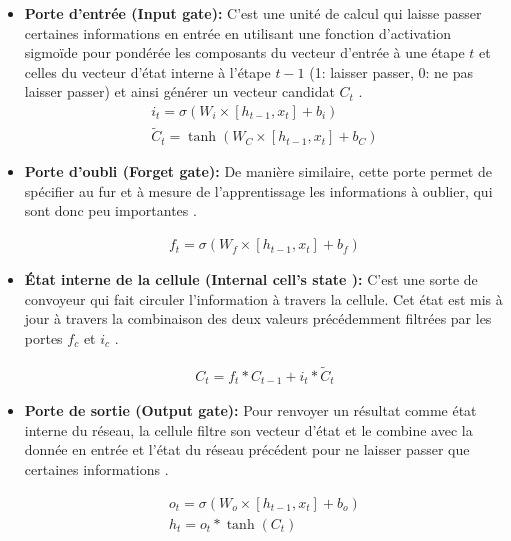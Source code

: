 		\begin{itemize}
			\item \textbf{Porte d'entrée (Input gate): } C'est une unité de calcul qui laisse passer certaines informations en entrée en utilisant une fonction d'activation sigmoïde pour pondérée les composants du vecteur d'entrée à une étape $t$ et celles du vecteur d'état interne à l'étape $t-1$ (1: laisser passer, 0: ne pas laisser passer) et ainsi générer un vecteur candidat $C_t$ \cite{lstm_original_paper}.
			\begin{equation}
			\begin{gathered}
			i_t = \sigma(W_i \times [h_{t-1},x_t] + b_i) \\
			\tilde{C}_t = \tanh(W_C \times [h_{t-1},x_t] + b_C)
			\end{gathered}
			\end{equation}
			
			\item \textbf{Porte d'oubli (Forget gate): } De manière similaire, cette porte permet de spécifier au fur et à mesure de l'apprentissage les informations à oublier, qui sont donc peu importantes \cite{lstm_original_paper,rnn_lstms}.
			
			\begin{equation}
			\begin{gathered}
			f_t = \sigma(W_f \times [h_{t-1},x_t] + b_f)
			\end{gathered}
			\end{equation}
			
			\item \textbf{État interne de la cellule (Internal cell's state ): } C'est une sorte de convoyeur qui fait circuler l'information à travers la cellule. Cet état est mis à jour à travers la combinaison des deux valeurs précédemment filtrées par les portes $f_c$ et $i_c$ \cite{lstm_original_paper}.
			
			\begin{equation}
			\begin{gathered}
			C_t = f_t * C_{t-1} + i_t*\tilde{C}_t
			\end{gathered}
			\end{equation}
			 
			\item \textbf{Porte de sortie (Output gate): } Pour renvoyer un résultat comme état interne du réseau, la cellule filtre son vecteur d'état et le combine avec la donnée en entrée et l'état du réseau précédent pour ne laisser passer que certaines informations \cite{rnns_online,lstm_original_paper,rnn_lstms}.
			
			\begin{equation}
			\begin{gathered}
			o_t =  \sigma(W_o \times [h_{t-1},x_t] + b_o) \\
			h_t = o_t * \tanh(C_t)
			\end{gathered}
			\end{equation}
		\end{itemize}
	
